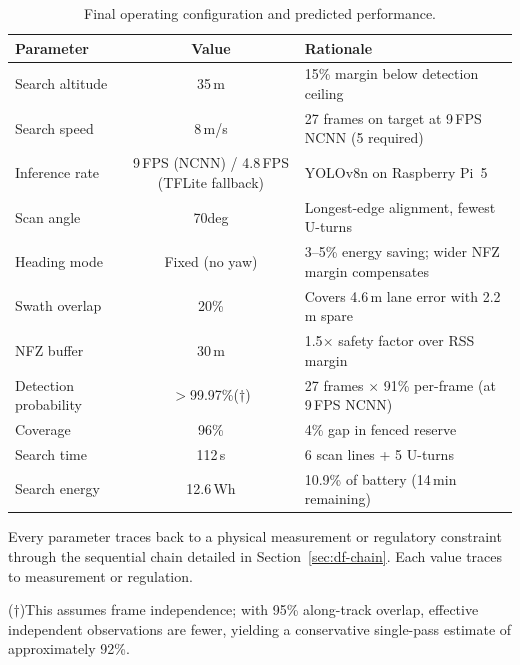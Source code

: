 \documentclass[10pt,a4paper]{article}
\def\textdegree{deg}%
\def\textsuperscript#1{(#1)}%
\newcommand{\compactTable}{\small\setlength{\tabcolsep}{3pt}\renewcommand{\arraystretch}{1.05}}
\begin{document}
\begin{table}[H]
  \centering\compactTable
  \caption{Final operating configuration and predicted performance.}\label{tab:df-final}
  \begin{tabularx}{\linewidth}{@{}l c l@{}}
    \toprule
    \textbf{Parameter} & \textbf{Value} & \textbf{Rationale} \\
    \midrule
    Search altitude       & 35\,m             & 15\% margin below detection ceiling \\
    Search speed          & 8\,m/s            & 27 frames on target at 9\,FPS NCNN (5 required) \\
    Inference rate         & 9\,FPS (NCNN) / 4.8\,FPS (TFLite fallback) & YOLOv8n on Raspberry Pi~5 \\
    Scan angle            & 70\textdegree     & Longest-edge alignment, fewest U-turns \\
    Heading mode          & Fixed (no yaw)    & 3--5\% energy saving; wider NFZ margin compensates \\
    Swath overlap         & 20\%              & Covers 4.6\,m lane error with 2.2\,m spare \\
    NFZ buffer            & 30\,m             & 1.5$\times$ safety factor over RSS margin \\
    \midrule
    Detection probability & $>$99.97\%\textsuperscript{$\dagger$} & 27 frames $\times$ 91\% per-frame (at 9\,FPS NCNN) \\
    Coverage              & 96\%              & 4\% gap in fenced reserve \\
    Search time           & 112\,s            & 6 scan lines + 5 U-turns \\
    Search energy         & 12.6\,Wh          & 10.9\% of battery (14\,min remaining) \\
    \bottomrule
  \end{tabularx}
\end{table}

Every parameter traces back to a physical measurement or regulatory constraint through the sequential chain detailed in Section~\ref{sec:df-chain}. Each value traces to measurement or regulation.

\smallskip
\noindent\textsuperscript{$\dagger$}This assumes frame independence; with 95\% along-track overlap, effective independent observations are fewer, yielding a conservative single-pass estimate of approximately 92\%.


\end{document}
